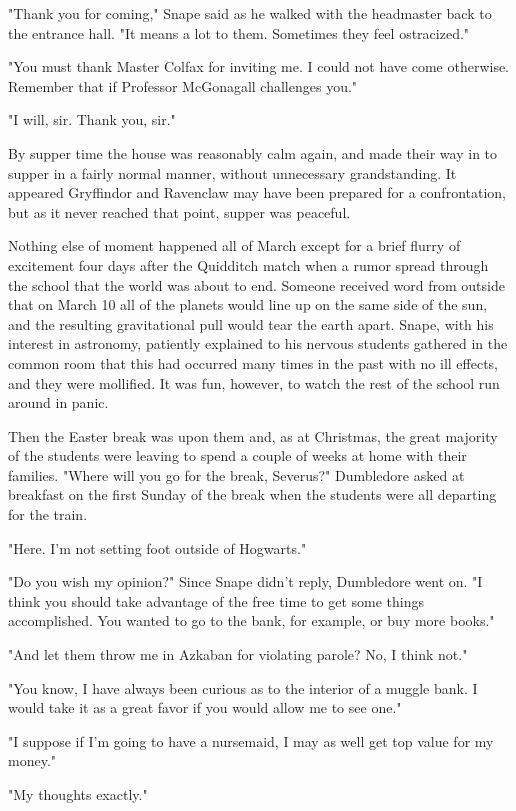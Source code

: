 "Thank you for coming," Snape said as he walked with the headmaster back to the entrance hall. "It means a lot to them. Sometimes they feel ostracized."

"You must thank Master Colfax for inviting me. I could not have come otherwise. Remember that if Professor McGonagall challenges you."

"I will, sir. Thank you, sir."

By supper time the house was reasonably calm again, and made their way in to supper in a fairly normal manner, without unnecessary grandstanding. It appeared Gryffindor and Ravenclaw may have been prepared for a confrontation, but as it never reached that point, supper was peaceful.

Nothing else of moment happened all of March except for a brief flurry of excitement four days after the Quidditch match when a rumor spread through the school that the world was about to end. Someone received word from outside that on March 10 all of the planets would line up on the same side of the sun, and the resulting gravitational pull would tear the earth apart. Snape, with his interest in astronomy, patiently explained to his nervous students gathered in the common room that this had occurred many times in the past with no ill effects, and they were mollified. It was fun, however, to watch the rest of the school run around in panic.

Then the Easter break was upon them and, as at Christmas, the great majority of the students were leaving to spend a couple of weeks at home with their families. "Where will you go for the break, Severus?" Dumbledore asked at breakfast on the first Sunday of the break when the students were all departing for the train.

"Here. I'm not setting foot outside of Hogwarts."

"Do you wish my opinion?" Since Snape didn't reply, Dumbledore went on. "I think you should take advantage of the free time to get some things accomplished. You wanted to go to the bank, for example, or buy more books."

"And let them throw me in Azkaban for violating parole? No, I think not."

"You know, I have always been curious as to the interior of a muggle bank. I would take it as a great favor if you would allow me to see one."

"I suppose if I'm going to have a nursemaid, I may as well get top value for my money."

"My thoughts exactly."


